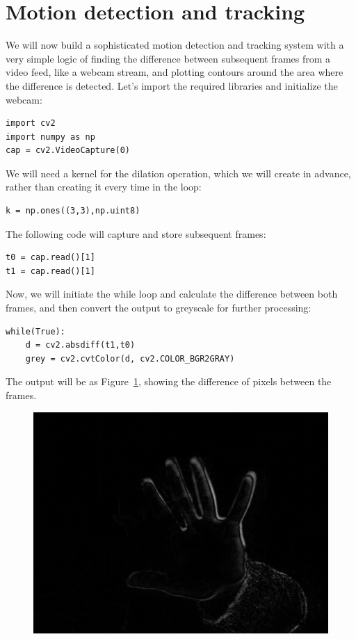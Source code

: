 \documentclass{labo}
\begin{document}
\section*{Motion detection and tracking}
We will now build a sophisticated motion detection and tracking system with a very simple logic of finding the difference between subsequent frames from a video feed, like a webcam stream, and plotting contours around the area where the difference is detected.
Let's import the required libraries and initialize the webcam:
\begin{verbatim}
import cv2
import numpy as np
cap = cv2.VideoCapture(0)
\end{verbatim}

We will need a kernel for the dilation operation, which we will create in advance, rather than creating it every time in the loop:
\begin{verbatim}
k = np.ones((3,3),np.uint8)
\end{verbatim}

The following code will capture and store subsequent frames:
\begin{verbatim}
t0 = cap.read()[1]
t1 = cap.read()[1]
\end{verbatim}

Now, we will initiate the while loop and calculate the difference between both frames, and then convert the output to greyscale for further processing:
\begin{verbatim}
while(True):
	d = cv2.absdiff(t1,t0)
	grey = cv2.cvtColor(d, cv2.COLOR_BGR2GRAY)
\end{verbatim}

The output will be as Figure~\ref{fig:motion-base}, showing the difference of pixels between the frames.
\begin{figure}[ht!]
\centering
\includegraphics[width=.7\textwidth]{motion-grey.png}
\caption{}
\label{fig:motion-base}
\end{figure}
\end{document}
